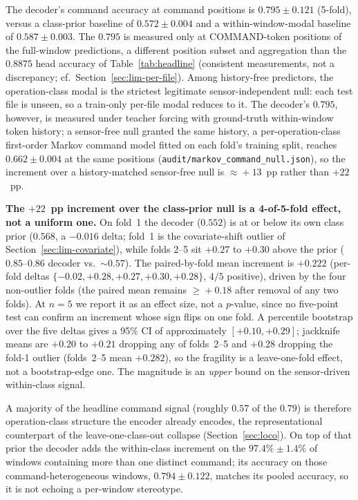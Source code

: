 \documentclass[sensors,article,submit,moreauthors,pdftex]{Definitions/mdpi}
\begin{document}
The decoder's command accuracy at command positions is $0.795 \pm 0.121$ (5-fold), versus a class-prior baseline of $0.572 \pm 0.004$ and a within-window-modal baseline of $0.587 \pm 0.003$. The $0.795$ is measured only at COMMAND-token positions of the full-window predictions, a different position subset and aggregation than the $0.8875$ head accuracy of Table~\ref{tab:headline} (consistent measurements, not a discrepancy; cf.\ Section~\ref{sec:lim-per-file}). Among history-free predictors, the operation-class modal is the strictest legitimate sensor-independent null: each test file is unseen, so a train-only per-file modal reduces to it. The decoder's $0.795$, however, is measured under teacher forcing with ground-truth within-window token history; a sensor-free null granted the same history, a per-operation-class first-order Markov command model fitted on each fold's training split, reaches $0.662 \pm 0.004$ at the same positions (\texttt{audit/markov\_command\_null.json}), so the increment over a history-matched sensor-free null is $\approx\!+13$~pp rather than $+22$~pp.

\textbf{The $+22$~pp increment over the class-prior null is a 4-of-5-fold effect, not a uniform one.} On fold~1 the decoder ($0.552$) is at or below its own class prior ($0.568$, a $-0.016$ delta; fold~1 is the covariate-shift outlier of Section~\ref{sec:lim-covariate}), while folds 2--5 sit $+0.27$ to $+0.30$ above the prior ($0.85$--$0.86$ decoder vs.\ $\sim\!0.57$). The paired-by-fold mean increment is $+0.222$ (per-fold deltas $\{-0.02, +0.28, +0.27, +0.30, +0.28\}$, $4/5$ positive), driven by the four non-outlier folds (the paired mean remains $\ge\!+0.18$ after removal of any two folds). At $n\!=\!5$ we report it as an effect size, not a $p$-value, since no five-point test can confirm an increment whose sign flips on one fold. A percentile bootstrap over the five deltas gives a 95\% CI of approximately $[+0.10, +0.29]$; jackknife means are $+0.20$ to $+0.21$ dropping any of folds~2--5 and $+0.28$ dropping the fold-1 outlier (folds~2--5 mean $+0.282$), so the fragility is a leave-one-fold effect, not a bootstrap-edge one. The magnitude is an \emph{upper} bound on the sensor-driven within-class signal.

A majority of the headline command signal (roughly $0.57$ of the $0.79$) is therefore operation-class structure the encoder already encodes, the representational counterpart of the leave-one-class-out collapse (Section~\ref{sec:loco}). On top of that prior the decoder adds the within-class increment on the $97.4\% \pm 1.4\%$ of windows containing more than one distinct command; its accuracy on those command-heterogeneous windows, $0.794 \pm 0.122$, matches its pooled accuracy, so it is not echoing a per-window stereotype.
\end{document}
